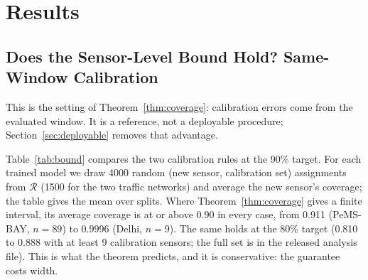 \section{Results}
\label{sec:results}

\subsection{Does the Sensor-Level Bound Hold? Same-Window Calibration}
\label{sec:bound}

This is the setting of Theorem~\ref{thm:coverage}: calibration errors come from the evaluated window. It is a reference, not a deployable procedure; Section~\ref{sec:deployable} removes that advantage.

Table~\ref{tab:bound} compares the two calibration rules at the 90\% target. For each trained model
we draw 4000 random (new sensor, calibration set) assignments from $\mathcal{R}$ (1500 for the two
traffic networks) and average the new sensor's coverage; the table gives the mean over splits.
Where Theorem~\ref{thm:coverage} gives a finite interval, its average coverage is at or above 0.90 in
every case, from 0.911 (PeMS-BAY, $n{=}89$) to 0.9996 (Delhi, $n{=}9$). The same holds at the 80\%
target (0.810 to 0.888 with at least 9 calibration sensors; the full set is in the released analysis
file). This is what the theorem predicts, and it is conservative: the guarantee costs width.

